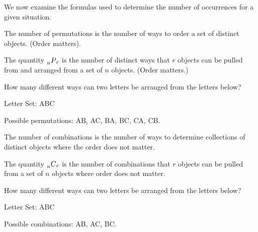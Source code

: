 



We now examine the formulas used to determine the number of
occurrences for a given situation.

\begin{definition}
  The number of permutations is the number of ways to order a set of
  distinct objects. (Order matters).
\end{definition}


\begin{notation}
  The quantity $\prescript{~}{n}{P}_r$ is the number of distinct ways
  that $r$ objects can be pulled from and arranged from a set of $n$
  objects.  (Order matters.)
\end{notation}

\begin{example}
  How many different ways can two letters be arranged from the letters
  below?

  Letter Set: ABC

  Possible permutations: AB, AC, BA, BC, CA, CB.

\end{example}

\begin{definition}
  The number of combinations is the number of ways to determine
  collections of distinct objects where the order does not matter.
\end{definition}

\begin{notation}
  The quantity $\prescript{~}{n}{C}_r$ is the number of combinations
  that $r$ objects can be pulled from a set of $n$ objects where order
  does not matter.
\end{notation}


\begin{example}
  How many different ways can two letters be arranged from the letters
  below?

  Letter Set: ABC

  Possible combinations: AB, AC, BC.
\end{example}

\clearpage


